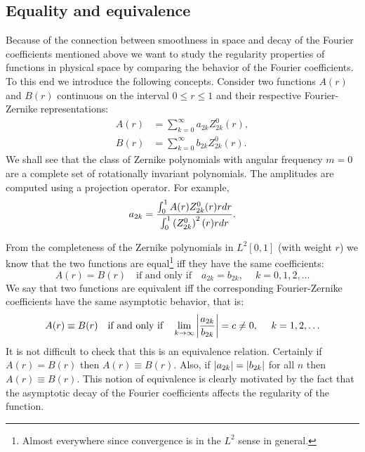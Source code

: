 \documentclass[preprint,12pt]{elsarticle}
\begin{document}
\subsection{Equality and equivalence}
Because of the connection between smoothness in space and decay of the Fourier coefficients mentioned above we want to study the regularity properties of functions in physical space by comparing the behavior of the Fourier coefficients. To this end we introduce the following concepts.
Consider two functions $A(r)$ and $B(r)$ continuous on the interval $0\le r\le 1$ and their respective Fourier-Zernike representations:
\begin{equation}
  \begin{split}
    A(r) & = \sum_{k=0}^{\infty} a_{2k} Z_{2k}^{0}(r), \\
    B(r) & = \sum_{k=0}^{\infty} b_{2k} Z_{2k}^{0}(r).
  \end{split}
\end{equation}
We shall see that the class of Zernike polynomials with angular frequency $m=0$ are a complete set of rotationally invariant polynomials.
The amplitudes are computed using a projection operator. For example,
\begin{equation}
  a_{2k} = \frac{\int_{0}^{1}{A(r) Z_{2k}^{0}(r)rdr}} {\int_{0}^{1}{\left( Z_{2k}^{0} \right)^{2}(r)rdr}}.
\end{equation}

From the completeness of the Zernike polynomials in $L^{2}[0,1]$ (with weight $r$) we know that the two functions are equal\footnote{Almost everywhere since convergence is in the $L^{2}$ sense in general.} iff they have the same coefficients:
\begin{equation}
  A(r) = B(r) \quad \text{if and only if} \quad a_{2k} = b_{2k}, \quad \ k=0,1,2,\dots
\end{equation}
We say that two functions are equivalent iff the corresponding Fourier-Zernike coefficients have the same asymptotic behavior, that is:
\begin{equation}
  A(r) \equiv B(r) \quad \text{if and only if} \quad \lim_{k\to\infty} \abs{\frac{a_{2k}}{b_{2k}}} = c \ne 0, \quad \ k=1,2,\dots
  \label{asymptote}
\end{equation}
It is not difficult to check that this is an equivalence relation. Certainly if $A(r)=B(r)$ then $A(r) \equiv B(r)$. Also, if $\left|a_{2k}\right| = \left|b_{2k}\right|$ for all $n$ then $A(r) \equiv B(r)$. This notion of equivalence is clearly motivated by the fact that the asymptotic decay of the Fourier coefficients affects the regularity of the function.
\end{document}
